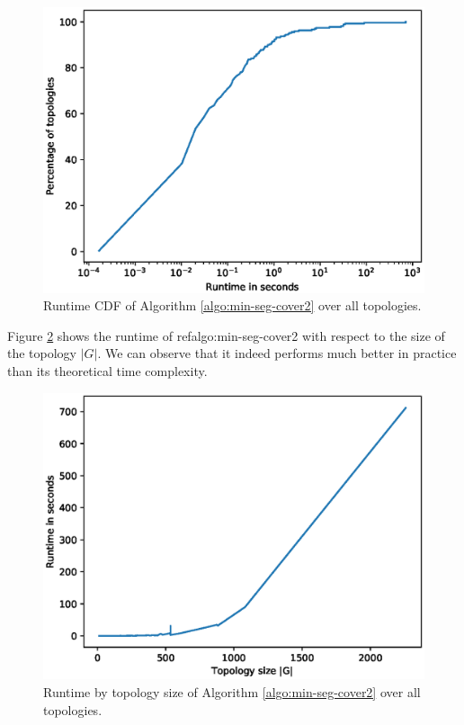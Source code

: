 \begin{figure}
\begin{center}
\includegraphics[width=.85\columnwidth]{./Network-lib/data/plot/minSegCover_runtime.eps}
\end{center}
\caption{Runtime CDF of Algorithm \ref{algo:min-seg-cover2} over all topologies.}
\label{fig:min-seg-cover-runtime}
\end{figure}

Figure \ref{fig:min-seg-cover-runtime-size} shows the runtime of ref{algo:min-seg-cover2} with respect to
the size of the topology $|G|$. We can observe that it indeed performs much better in practice than its theoretical
time complexity.

\begin{figure}
\begin{center}
\includegraphics[width=.85\columnwidth]{./Network-lib/data/plot/minSegCover_runtime_by_size.eps}
\end{center}
\caption{Runtime by topology size of Algorithm \ref{algo:min-seg-cover2} over all topologies.}
\label{fig:min-seg-cover-runtime-size}
\end{figure}

